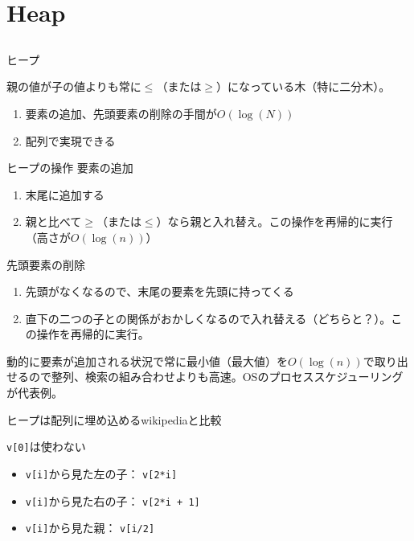 \documentclass{beamer}
\begin{document}
\section{Heap}		%
\subsection{}

\begin{frame}[fragile]{ヒープ}{}

親の値が子の値よりも常に$\le$（または$\ge$）になっている木（特に二分木）。

\begin{enumerate}\itemsep8pt
\item 要素の追加、先頭要素の削除の手間が$O(\log(N))$
\item 配列で実現できる
\end{enumerate}
\end{frame}


\begin{frame}[fragile]{ヒープの操作}{}
要素の追加

\begin{enumerate}%
\item 末尾に追加する
\item 親と比べて$\ge$（または$\le$）なら親と入れ替え。この操作を再帰的に実行（高さが$O(\log(n))$）
\end{enumerate}

先頭要素の削除
\begin{enumerate}%
\item 先頭がなくなるので、末尾の要素を先頭に持ってくる
\item 直下の二つの子との関係がおかしくなるので入れ替える（どちらと？）。この操作を再帰的に実行。
\end{enumerate}

動的に要素が追加される状況で常に最小値（最大値）を$O(\log(n))$で取り出せるので整列、検索の組み合わせよりも高速。OSのプロセススケジューリングが代表例。
\end{frame}

\begin{frame}[fragile]{ヒープは配列に埋め込める}{wikipediaと比較}

\begin{center}
\end{center}
\texttt{v[0]}は使わない

\vfill
\begin{itemize}%
\item \texttt{v[i]}から見た左の子： \texttt{v[2*i]}
\item \texttt{v[i]}から見た右の子： \texttt{v[2*i + 1]}
\item \texttt{v[i]}から見た親： \texttt{v[i/2]}
\end{itemize}
\end{frame}
\end{document}
